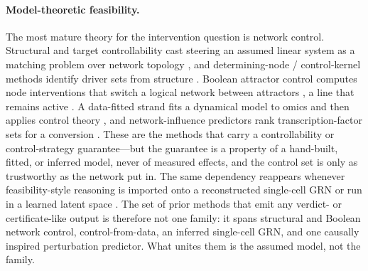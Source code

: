 \paragraph{Model-theoretic feasibility.}
The most mature theory for the intervention question is network control. Structural and
target controllability cast steering an assumed linear system as a matching problem over
network topology \citep{Liu2011,Gao2014}, and determining-node / control-kernel methods
identify driver sets from structure \citep{Mochizuki2013,Kim2013}. Boolean attractor
control computes node interventions that switch a logical network between attractors
\citep{Zanudo2015,Zanudo2017,Joo2018,Marazzi2022}, a line that remains active
\citep{Cifuentes-Fontanals2025,Metzcar2025,Murrugarra2025,Trinh2025,Vecchio2026}. A
data-fitted strand fits a dynamical model to omics and then applies control theory
\citep{Ronquist2017,Rukhlenko2022,Wytock2024}, and network-influence predictors rank
transcription-factor sets for a conversion \citep{Rackham2016,Cahan2014}. These are the
methods that carry a controllability or control-strategy guarantee---but the guarantee is
a property of a hand-built, fitted, or inferred model, never of measured effects, and the
control set is only as trustworthy as the network put in. The same dependency reappears
whenever feasibility-style reasoning is imported onto a reconstructed single-cell GRN
\citep{Wang2023CEFCON} or run in a learned latent space \citep{Han2025}. The set of prior
methods that emit any verdict- or certificate-like output is therefore not one family: it
spans structural and Boolean network control, control-from-data, an inferred single-cell
GRN, and one causally inspired perturbation predictor. What unites them is the assumed
model, not the family.

